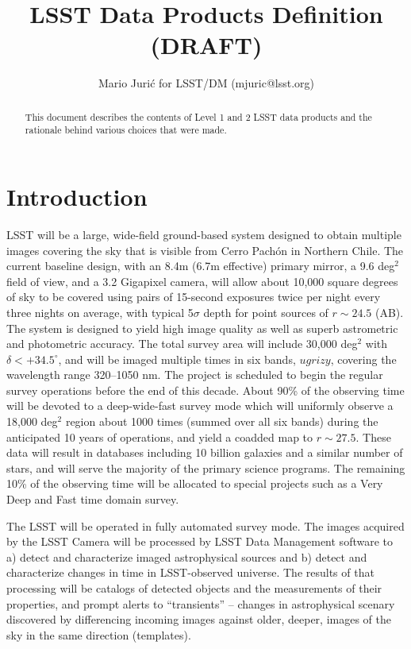 \documentclass[12pt]{article}
\title{LSST Data Products Definition (DRAFT)}
\author{Mario Juri\'c for LSST/DM (mjuric@lsst.org)}
\newcommand{\B}[1]{{#1}}
\newcommand{\R}[1]{{\color{red}}}
\begin{document}
\maketitle

\begin{abstract}
This document describes the contents of Level 1 and 2 LSST data products and the rationale behind various choices that were made.
\end{abstract}

\tableofcontents

\section{Introduction}

LSST will be a large, wide-field ground-based system
designed to obtain multiple images covering the sky that is visible from Cerro Pach\'{o}n in Northern Chile. The current baseline design, with an 8.4m (6.7m effective) primary mirror, a 9.6 deg$^2$ field of view, and a 3.2 Gigapixel camera, will allow about 10,000 square degrees of sky to be covered using pairs  of 15-second exposures \R{in two photometric bands} \B{twice per night} every three nights on average, with typical 5$\sigma$ depth for point sources of $r\sim24.5$ (AB). The system is designed to yield high image quality as well as superb astrometric  and photometric accuracy. The \B{total} survey area will include 30,000 deg$^2$ with $\delta<+34.5^\circ$, and will be imaged multiple times in six bands, $ugrizy$, covering the wavelength range 320--1050 nm. The project is scheduled to  begin the regular survey operations before the end of this decade. About 90\% of the observing time will be devoted to a deep-wide-fast survey mode which will \B{uniformly} observe a 18,000 deg$^2$ region about 1000 times (summed over all six bands) during the anticipated 10 years of operations, and yield a coadded map to $r\sim27.5$. These data will result in databases including 10 billion galaxies and a similar number of stars, and will serve the majority of the primary science programs. The remaining 10\% of the observing time will be allocated to special projects such as a Very Deep and Fast time domain survey.

The LSST will be operated in fully automated survey mode. The images acquired by the LSST Camera will be processed by LSST Data Management software to a) detect and characterize imaged astrophysical sources and b) detect and characterize changes in time in LSST-observed universe. The results of that processing will be catalogs of detected objects and the measurements of their properties, and prompt alerts to ``transients'' -- changes in astrophysical scenary discovered by differencing incoming images against older, deeper, images of the sky in the same direction (templates).
\end{document}
